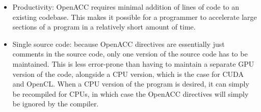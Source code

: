 \begin{itemize}
    \item Productivity: OpenACC requires minimal addition of lines of code to an existing codebase. This makes it possible for a programmer to accelerate large sections of a program in a relatively short amount of time. 
    \item Single source code: because OpenACC directives are essentially just comments in the source code, only one version of the source code has to be maintained. This is less error-prone than having to maintain a separate GPU version of the code, alongside a CPU version, which is the case for CUDA and OpenCL. When a CPU version of the program is desired, it can simply be recompiled for CPUs, in which case the OpenACC directives will simply be ignored by the compiler. 
\end{itemize}

